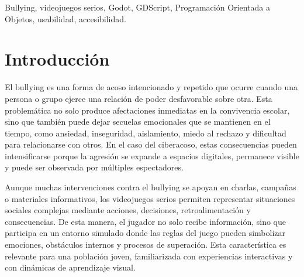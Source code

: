\documentclass[conference]{IEEEtran}
\begin{document}
\begin{abstract}
This paper presents the design and development of \textit{Deep Shadows}, a 2D platform video game created by Pineapple Engine to raise awareness about the emotional consequences of bullying. The project approached the problem through an interactive experience in which the player controls a protagonist who moves through school and symbolic spaces shaped by intrusive thoughts, visual distortion, and obstacles related to harassment. The solution was implemented in Godot using GDScript and structured under object-oriented programming principles, including custom classes for the player, enemies, puzzles, save system, abilities, interface, dialogues, level control, and a simple linked-list ADT. The methodology integrated functional requirements, non-functional requirements based on FURPS, design patterns, and a pilot usability evaluation. As a result, a playable prototype was obtained with a menu, save slots, accessibility options, controls manual, movement, jumping, stamina-based sprinting, random puzzles, temporary glasses activation, HUD, enemies, checkpoints, dialogues, and world progression. The project concludes that the game can communicate the impact of bullying through understandable gameplay mechanics and a technically defensible software architecture.
\end{abstract}

\begin{IEEEkeywords}
Bullying, videojuegos serios, Godot, GDScript, Programación Orientada a Objetos, usabilidad, accesibilidad.
\end{IEEEkeywords}

\section{Introducción}
El bullying es una forma de acoso intencionado y repetido que ocurre cuando una persona o grupo ejerce una relación de poder desfavorable sobre otra. Esta problemática no solo produce afectaciones inmediatas en la convivencia escolar, sino que también puede dejar secuelas emocionales que se mantienen en el tiempo, como ansiedad, inseguridad, aislamiento, miedo al rechazo y dificultad para relacionarse con otros. En el caso del ciberacoso, estas consecuencias pueden intensificarse porque la agresión se expande a espacios digitales, permanece visible y puede ser observada por múltiples espectadores.

Aunque muchas intervenciones contra el bullying se apoyan en charlas, campañas o materiales informativos, los videojuegos serios permiten representar situaciones sociales complejas mediante acciones, decisiones, retroalimentación y consecuencias. De esta manera, el jugador no solo recibe información, sino que participa en un entorno simulado donde las reglas del juego pueden simbolizar emociones, obstáculos internos y procesos de superación. Esta característica es relevante para una población joven, familiarizada con experiencias interactivas y con dinámicas de aprendizaje visual.
\end{document}
